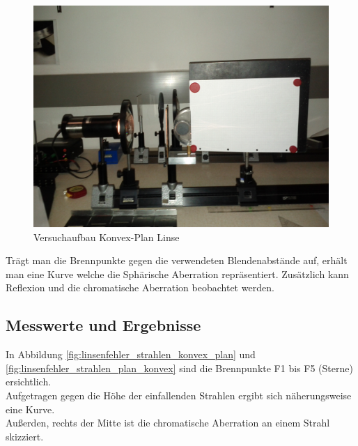 \documentclass[12pt,a4paper]{article}
\begin{document}
\begin{figure}[H]
	\centering
	\includegraphics[scale=0.13]{./figure/linsenfehler.jpg}
	\caption{Versuchaufbau Konvex-Plan Linse}
	\label{fig:linsenfehler_aufbau}
\end{figure}

\begin{multicols}{2}

\noindent
Trägt man die Brennpunkte gegen die verwendeten Blendenabstände auf, erhält man eine Kurve welche die Sphärische Aberration repräsentiert. Zusätzlich kann Reflexion und die chromatische Aberration beobachtet werden.
\subsection{Messwerte und Ergebnisse}
In Abbildung \ref{fig:linsenfehler_strahlen_konvex_plan} und \ref{fig:linsenfehler_strahlen_plan_konvex} sind die Brennpunkte F1 bis F5 (Sterne) ersichtlich.\\
Aufgetragen gegen die Höhe der einfallenden Strahlen ergibt sich näherungsweise eine Kurve.\\
Außerden, rechts der Mitte ist die chromatische Aberration an einem Strahl skizziert.


\end{multicols}
\end{document}
